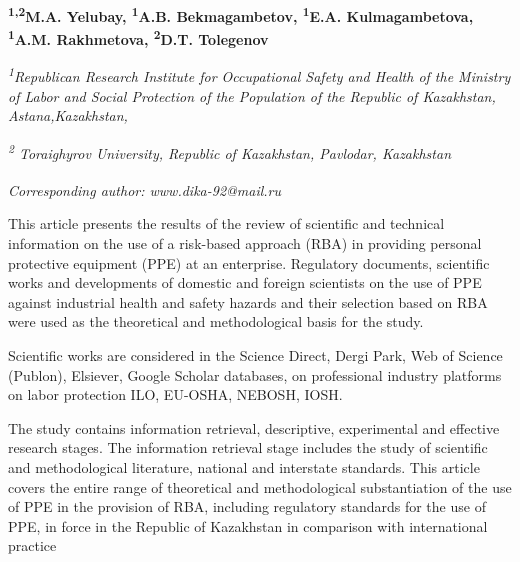 
\begin{articleheader}

{\bfseries \textsuperscript{1,2}M.A. Yelubay\authorid,
\textsuperscript{1}A.B. Bekmagambetov\authorid,
\textsuperscript{1}E.A. Kulmagambetova\authorid,
\textsuperscript{1}A.M. Rakhmetova,\authorid 
\textsuperscript{2}D.T. Tolegenov\textsuperscript{\envelope } \authorid}
\end{articleheader}

\begin{affiliation}
\emph{\textsuperscript{1}Republican Research Institute for Occupational Safety and Health of the
Ministry of Labor and Social Protection of the Population of the Republic of Kazakhstan, Astana,Kazakhstan,}

\emph{\textsuperscript{2} Toraighyrov University, Republic of Kazakhstan, Pavlodar, Kazakhstan}

\raggedright \textsuperscript{\envelope }{\em Corresponding author: www.dika-92@mail.ru}
\end{affiliation}

This article presents the results of the review of scientific and
technical information on the use of a risk-based approach (RBA) in
providing personal protective equipment (PPE) at an enterprise.
Regulatory documents, scientific works and developments of domestic and
foreign scientists on the use of PPE against industrial health and
safety hazards and their selection based on RBA were used as the
theoretical and methodological basis for the study.

Scientific works are considered in the Science Direct, Dergi Park, Web
of Science (Publon), Elsiever, Google Scholar databases, on professional
industry platforms on labor protection ILO, EU-OSHA, NEBOSH, IOSH.

The study contains information retrieval, descriptive, experimental and
effective research stages. The information retrieval stage includes the
study of scientific and methodological literature, national and
interstate standards. This article covers the entire range of
theoretical and methodological substantiation of the use of PPE in the
provision of RBA, including regulatory standards for the use of PPE, in
force in the Republic of Kazakhstan in comparison with international
practice

